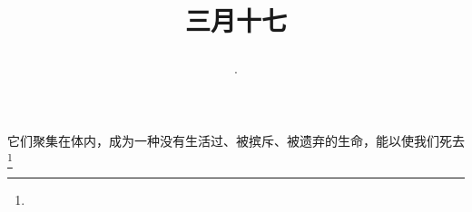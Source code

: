 \title{\date[d=25,m=4,y=2024][year:cn-y,年,month:cn,day:cn,日,·,weekday]·三月十七 }
它们聚集在体内，成为一种没有生活过、被摈斥、被遗弃的生命，能以使我们死去\footnote{ }

